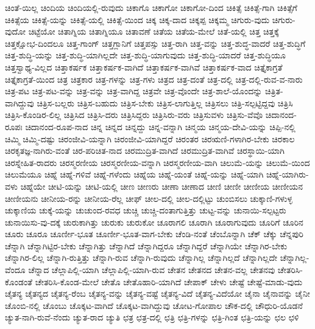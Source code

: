 {ಚಿಂತೆ-ಯಿಲ್ಲ
ಚಿಂದಿಯ
ಚಿಂದಿಯಲ್ಲಿ-ರುವುದು
ಚಿಕಾಗೊ
ಚಿಕಾಗೋ
ಚಿಕಾಗೋ-ದಿಂದ
ಚಿಕಿತ್ಸೆ
ಚಿಕಿತ್ಸೆ-ಗಾಗಿ
ಚಿಕಿತ್ಸೆಗೆ
ಚಿಕಿತ್ಸೆಯ
ಚಿಕಿತ್ಸೆ-ಯನ್ನು
ಚಿಕಿತ್ಸೆ-ಯಲ್ಲಿ
ಚಿಕಿತ್ಸೆ-ಯಿಂದ
ಚಿಕ್ಕ
ಚಿಕ್ಕ-ದಾದ
ಚಿಕ್ಕಪ್ಪ
ಚಿಕ್ಕಮ್ಮ
ಚಿಗುರು-ವುದು
ಚಿಗುರು-ವುದೋ
ಚಿಟ್ಟೆಯೋ
ಚಿತಾಗ್ನಿಯ
ಚಿತಾಗ್ನಿಯೂ
ಚಿತಾವಣೆ
ಚಿತೆಯ
ಚಿತೆಯ-ಮೇಲೆ
ಚಿತೆ-ಯಲ್ಲಿ
ಚಿತ್ತ
ಚಿತ್ತಕ್ಕೆ
ಚಿತ್ತಕ್ಷೋಭ-ದಿಂದಲೂ
ಚಿತ್ತ-ಗಾಂಗ್
ಚಿತ್ತಗ್ಲಾನಿಗೆ
ಚಿತ್ತಪಸ್ಸು
ಚಿತ್ತ-ರಾಗಿ
ಚಿತ್ತ-ವನ್ನು
ಚಿತ್ತ-ಶುದ್ಧ-ವಾದರೆ
ಚಿತ್ತ-ಶುದ್ಧಿಗೆ
ಚಿತ್ತ-ಶುದ್ಧಿ-ಯನ್ನು
ಚಿತ್ತ-ಶುದ್ಧಿ-ಯಾಗಿಲ್ಲದೇ
ಚಿತ್ತ-ಶುದ್ಧಿ-ಯಾಗುವುದು
ಚಿತ್ತ-ಶುದ್ಧಿ-ಯಾದರೆ
ಚಿತ್ತ-ಶುದ್ಧಿಯೂ
ಚಿತ್ತಸ್ವಾಥ್ಯ-ವಿಲ್ಲದ
ಚಿತ್ತಾಕರ್ಷಕ
ಚಿತ್ತಾಕರ್ಷಕ-ವಾಗಿದೆ
ಚಿತ್ತಾಕರ್ಷಕ-ವಾಗಿವೆ
ಚಿತ್ತಾಕರ್ಷಕ-ವಾದ
ಚಿತ್ತೈಕಾಗ್ರತೆ
ಚಿತ್ತೈಕಾಗ್ರತೆ-ಯಿಂದ
ಚಿತ್ರ
ಚಿತ್ರಕಾರ
ಚಿತ್ರ-ಗಳನ್ನು
ಚಿತ್ರ-ಗಳು
ಚಿತ್ರದ
ಚಿತ್ರ-ದಂತೆ
ಚಿತ್ರ-ದಲ್ಲಿ
ಚಿತ್ರ-ದಲ್ಲಿ-ರುವ-ವ-ನಾರು
ಚಿತ್ರ-ಪಟ
ಚಿತ್ರ-ಪಟ-ವನ್ನು
ಚಿತ್ರ-ವನ್ನು
ಚಿತ್ರ-ವಾಗಿದ್ದ
ಚಿತ್ರವೇ
ಚಿತ್ರ-ವೊಂದೇ
ಚಿತ್ರ-ಶಾಲೆ-ಯೊಂದನ್ನು
ಚಿತ್ರಿತ-ವಾಗಿದ್ದುವು
ಚಿತ್ರಿಸ-ಬಲ್ಲರು
ಚಿತ್ರಿಸ-ಬಹುದು
ಚಿತ್ರಿಸ-ಬೇಕು
ಚಿತ್ರಿಸ-ಲಾಗುತ್ತಿಲ್ಲ
ಚಿತ್ರಿಸಲು
ಚಿತ್ರಿ-ಸಲ್ಪಟ್ಟಿದ್ದವು
ಚಿತ್ರಿಸಿ
ಚಿತ್ರಿಸಿ-ಕೊಂಡಿರ-ಲಿಲ್ಲ
ಚಿತ್ರಿಸಿದ
ಚಿತ್ರಿಸಿ-ದರು
ಚಿತ್ರಿಸಿದ್ದರು
ಚಿತ್ರಿಸಿರು-ವರು
ಚಿತ್ರಿಸುವಳು
ಚಿತ್ರಿಸು-ವೆವೊ
ಚಿದಾನಂದ-ರೂಪಃ
ಚಿದಾನಂದ-ರೂಪ-ನಾದ
ಚಿನ್ನ
ಚಿನ್ನದ
ಚಿನ್ನದ್ದು
ಚಿನ್ನ-ವನ್ನಾಗಿ
ಚಿನ್ಮಯ
ಚಿನ್ಮಯ-ದೇವಿ-ಯನ್ನು
ಚಿಪ್ಪಿ-ನಲ್ಲಿ
ಚಿಮ್ಮಿ
ಚಿಮ್ಮಿ-ದಷ್ಟು
ಚಿರಂಜೀವಿ-ಯನ್ನಾಗಿ
ಚಿರಂಜೀವಿ-ಯಾಗಿದ್ದರೆ
ಚಿರಂತರ
ಚಿರಋಣಿ-ಗಳಾಗಿರ-ಬೇಕು
ಚಿರಕಾಲ
ಚಿರಕೃತಜ್ಞ-ನಾಗಿರು-ವಂತೆ
ಚಿರ-ಪರಿಚಿತ-ನಾದ
ಚಿರಮುದ್ರಿತ-ವಾಗಿದೆ
ಚಿರಮುದ್ರಿತ-ವಾಗಿವೆ
ಚಿರಸ್ಥಾಯಿ-ಯಾಗಿ
ಚಿರಸ್ನೇಹಿತ-ರಾದರು
ಚಿರಸ್ಮರಣೀಯ
ಚಿರಸ್ಮರಣೀಯ-ವನ್ನಾಗಿ
ಚಿರಸ್ಮರಣೀಯ-ವಾಗಿ
ಚಿಲುಮೆ-ಯನ್ನು
ಚಿಲುಮೆ-ಯಿಂದ
ಚಿಲುಮೆಯೂ
ಚಿಹ್ನೆ
ಚಿಹ್ನೆ-ಗಳಿವೆ
ಚಿಹ್ನೆ-ಗಳೆಂದು
ಚಿಹ್ನೆಯ
ಚಿಹ್ನೆ-ಯಂತೆ
ಚಿಹ್ನೆ-ಯನ್ನು
ಚಿಹ್ನೆ-ಯಾಗಿ
ಚಿಹ್ನೆ-ಯಾಗಿರು-ವಳು
ಚಿಹ್ನೆಯೇ
ಚೀಟಿ-ಯನ್ನು
ಚೀಟಿ-ಯಲ್ಲಿ
ಚೀಣ
ಚೀಣರು
ಚೀಣಾ
ಚೀಣಾದ
ಚೀಣಿ
ಚೀಣೀ
ಚೀಣೀಯ
ಚೀಣೀಯನ
ಚೀಣೀಯನು
ಚೀನೀಯ-ರನ್ನು
ಚೀನೀಯ-ರೆಲ್ಲ
ಚೀಫ್
ಚೀಲ-ದಲ್ಲಿ
ಚೀಲ-ದಲ್ಲಿಟ್ಟು
ಚುಂಬಿಸಲು
ಚುಕ್ಕಾಣಿ-ಗಳುಳ್ಳ
ಚುಕ್ಕಾಣಿಯ
ಚುಕ್ಕೆ-ಯನ್ನು
ಚುಚುಂದ-ರವಧ
ಚುಚ್ಚಿ
ಚುಚ್ಚಿ-ದಂತಾಗುತ್ತಿತ್ತು
ಚುಟ್ಟ-ವನ್ನು
ಚುನಾಯಿ-ಸಲ್ಪಟ್ಟರು
ಚುನಾಯಿಸು-ವು-ದಕ್ಕೆ
ಚುರುಕಾಗಿತ್ತು
ಚುರುಕು
ಚುರುಕೋ
ಚೂರಾಗಲಿ
ಚೂರಾಗಿ
ಚೂರಾಗುವುದು
ಚೂರಿಗೆ
ಚೂರಿನ
ಚೂರು
ಚೂರೂ
ಚೂರ್ಣೀ-ಭೂತ
ಚೂರ್ಣೀ-ಭೂತ-ವಾಗ-ಬೇಕು
ಚೆಂಡಿ-ನಂತೆ
ಚೆಂಬೊನ್ನಾಗಿ
ಚೆಕ್
ಚೆಕ್ಕು
ಚೆನ್ನಪುರಿ
ಚೆನ್ನಾಗಿ
ಚೆನ್ನಾಗಿಟ್ಟಿರ-ಬೇಕು
ಚೆನ್ನಾಗಿತ್ತು
ಚೆನ್ನಾಗಿದೆ
ಚೆನ್ನಾಗಿದ್ದರೂ
ಚೆನ್ನಾಗಿದ್ದರೆ
ಚೆನ್ನಾಗಿಯೇ
ಚೆನ್ನಾಗಿರ-ಬೇಕು
ಚೆನ್ನಾಗಿರ-ಲಿಲ್ಲ
ಚೆನ್ನಾಗಿ-ರುತ್ತಿತ್ತು
ಚೆನ್ನಾಗಿ-ರುವ
ಚೆನ್ನಾಗಿ-ರುವುದು
ಚೆನ್ನಾಗಿಲ್ಲ
ಚೆನ್ನಾಗಿಲ್ಲದೆ
ಚೆನ್ನಾಗಿಲ್ಲದೇ
ಚೆನ್ನಾಗಿಲ್ಲ-ವೆಂದೂ
ಚೆನ್ನಾದ
ಚೆಲ್ಲಾಪಿಲ್ಲಿ-ಯಾಗಿ
ಚೆಲ್ಲಾಪಿಲ್ಲಿ-ಯಾಗಿ-ರುವ
ಚೇತನ
ಚೇತನದ
ಚೇತನ-ವಲ್ಲ
ಚೇತನವು
ಚೇತರಿಸಿ-ಕೊಂಡಂತೆ
ಚೇತರಿಸಿ-ಕೊಂಡ-ಮೇಲೆ
ಚೇತೊ
ಚೇತೊಹಾರಿ-ಯಾಗಿದೆ
ಚೇಪಾಕ್
ಚೇಳು
ಚೇಷ್ಟೆ
ಚೇಷ್ಟೆ-ಮಾಡು-ವುದು
ಚೈತನ್ಯ
ಚೈತನ್ಯದ
ಚೈತನ್ಯ-ರೆಂಬ
ಚೈತನ್ಯ-ವನ್ನು
ಚೈತನ್ಯ-ವಷ್ಟೆ
ಚೈತನ್ಯ-ವಿದೆ
ಚೈತನ್ಯ-ವಿದೆಯೋ
ಚೈನಾ
ಚೈನಾವನ್ನು
ಚೈನೀ
ಚೊಂಬಿ-ನಲ್ಲಿ
ಚೊಂಬು
ಚೊಕ್ಕಟ-ವಾಗಿದೆ
ಚೊಕ್ಕಟ-ವಾಗಿದ್ದುವು
ಚೋಟ-ಗೋಪಾಲ
ಚೌಕ-ದಲ್ಲಿ
ಚೌಧುರಿ-ಯೊಡನೆ
ಚ್ಯುತ-ನಾಗಿ-ರುವೆ-ನೆಂದು
ಚ್ಯುತ-ರಾದ
ಚ್ಯುತಿ
ಛತ್ರ
ಛತ್ರ-ದಲ್ಲಿ
ಛತ್ರಿ
ಛತ್ರಿ-ಗಳನ್ನು
ಛತ್ರಿ-ಗಿಂತ
ಛತ್ರಿ-ಯನ್ನು
ಛಲ
ಛಳಿ
}

